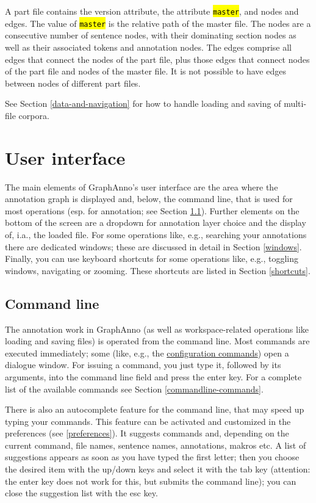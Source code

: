 \documentclass[12pt]{scrartcl}
\newcommand{\code}[1]{\hl{\texttt{#1}}}
\begin{document}
A part file contains the version attribute, the attribute \code{master}, and nodes and edges.
The value of \code{master} is the relative path of the master file.
The nodes are a consecutive number of sentence nodes, with their dominating section nodes as well as their associated tokens and annotation nodes.
The edges comprise all edges that connect the nodes of the part file, plus those edges that connect nodes of the part file and nodes of the master file.
It is not possible to have edges between nodes of different part files.

See Section \ref{data-and-navigation} for how to handle loading and saving of multi-file corpora.



\section{User interface}

The main elements of GraphAnno’s user interface are the area where the annotation graph is displayed and, below, the command line, that is used for most operations (esp. for annotation; see Section \ref{commandline}).
Further elements on the bottom of the screen are a dropdown for annotation layer choice and the display of, i.a., the loaded file.
For some operations like, e.g., searching your annotations there are dedicated windows; these are discussed in detail in Section \ref{windows}.
Finally, you can use keyboard shortcuts for some operations like, e.g., toggling windows, navigating or zooming.
These shortcuts are listed in Section \ref{shortcuts}.


\subsection{Command line}\label{commandline}

The annotation work in GraphAnno (as well as workspace-related operations like loading and saving files) is operated from the command line.
Most commands are executed immediately; some (like, e.g., the \hyperref[konfiguration]{configuration commands}) open a dialogue window.
For issuing a command, you just type it, followed by its arguments, into the command line field and press the enter key.
For a complete list of the available commands see Section \ref{commandline-commands}.

There is also an autocomplete feature for the command line, that may speed up typing your commands.
This feature can be activated and customized in the preferences (see \ref{preferences}).
It suggests commands and, depending on the current command, file names, sentence names, annotations, makros etc.
A list of suggestions appears as soon as you have typed the first letter; then you choose the desired item with the up/down keys and select it with the tab key (attention: the enter key does not work for this, but submits the command line); you can close the suggestion list with the esc key.
\end{document}
